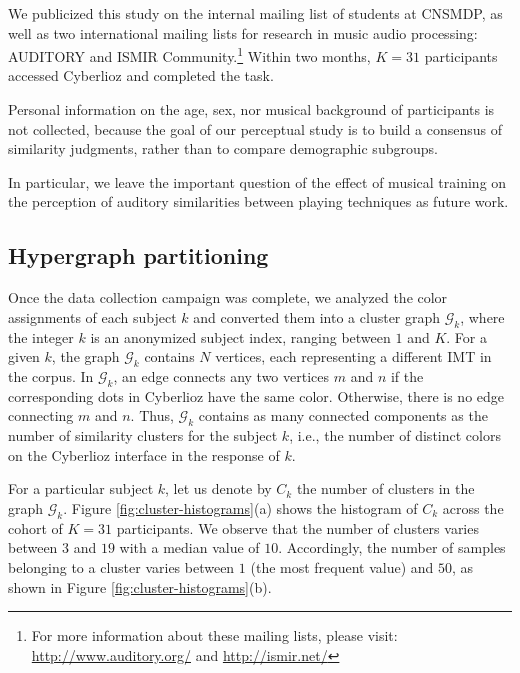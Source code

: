 \documentclass{bmcart}
\makeatletter
\newcommand*{\ie}{i.e.,\@\xspace}
\newcommand{\ipt}{IPT\xspace}
\makeatother
\begin{document}
We publicized this study on the internal mailing list of students at CNSMDP, as well as two international mailing lists for research in music audio processing: AUDITORY  and ISMIR Community.\footnote{
For more information about these mailing lists, please visit:
\url{http://www.auditory.org/} and \url{http://ismir.net/}}
Within two months, $K=31$ participants accessed Cyberlioz and completed the task.

Personal information on the age, sex, nor musical background of participants is not collected, because the goal of our perceptual study is to build a consensus of similarity judgments, rather than to compare demographic subgroups.

In particular, we leave the important question of the effect of musical training on the perception of auditory similarities between playing techniques as future work.

\subsection*{Hypergraph partitioning}

Once the data collection campaign was complete, we analyzed the color assignments of each subject $k$ and converted them into a cluster graph $\mathcal{G}_k$, where the integer $k$ is an anonymized subject index, ranging between $1$ and $K$.
For a given $k$, the graph $\mathcal{G}_k$ contains $N$ vertices, each representing a different IMT in the corpus.
In $\mathcal{G}_k$, an edge connects any two vertices $m$ and $n$ if the corresponding dots in Cyberlioz have the same color.
Otherwise, there is no edge connecting $m$ and $n$.
Thus, $\mathcal{G}_k$ contains as many connected components as the number of similarity clusters for the subject $k$, \ie{} the number of distinct colors on the Cyberlioz interface in the response of $k$.

For a particular subject $k$, let us denote by $C_k$ the number of clusters in the graph $\mathcal{G}_k$.
Figure \ref{fig:cluster-histograms}(a) shows the histogram of $C_k$ across the cohort of $K=31$ participants.
We observe that the number of clusters varies between $3$ and $19$ with a median value of $10$.
Accordingly, the number of samples belonging to a cluster varies between $1$ (the most frequent value) and $50$, as shown in Figure \ref{fig:cluster-histograms}(b).
\end{document}
